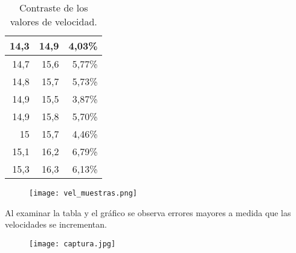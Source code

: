 \begin{table}[H]
\begin{tabular}{|r|r|r}
		14,3 & 14,9 & \multicolumn{1}{r|}{4,03\%} \\ \hline
		14,7 & 15,6 & \multicolumn{1}{r|}{5,77\%} \\ \hline
		14,8 & 15,7 & \multicolumn{1}{r|}{5,73\%} \\ \hline
		14,9 & 15,5 & \multicolumn{1}{r|}{3,87\%} \\ \hline
		14,9 & 15,8 & \multicolumn{1}{r|}{5,70\%} \\ \hline
		15 & 15,7 & \multicolumn{1}{r|}{4,46\%} \\ \hline
		15,1 & 16,2 & \multicolumn{1}{r|}{6,79\%} \\ \hline
		15,3 & 16,3 & \multicolumn{1}{r|}{6,13\%} \\ \hline
	\end{tabular}
	\caption{Contraste de los valores de velocidad.}
\label{difvel}
\end{table}


\begin{figure}[H]
	\centering
	\texttt{[image: vel\_muestras.png]}
	\label{fig:vel_muestras}
\end{figure}


Al examinar la tabla y el gráfico se observa errores mayores a medida que las velocidades se incrementan.

\begin{figure}[H]
	\centering
	\texttt{[image: captura.jpg]}
	\label{fig:capt}
\end{figure}


